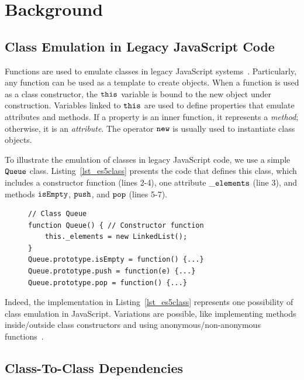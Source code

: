 \documentclass[review]{elsarticle}
\newcommand{\mcode}[1]{$\tt #1$}
\begin{document}
\section{Background}
\label{sec:background}

\subsection{Class Emulation in Legacy JavaScript Code}
\label{sec:class-emulation}

Functions are used to emulate classes in legacy JavaScript systems~\cite{leonardo-jsep2017, rostami2016}. Particularly, any function can be used as a template to create objects. When a function is used as a class constructor, the \mcode{this} variable is bound to the new object under construction. Variables linked to \mcode{this} are used to define properties that emulate attributes and methods. If a property is an inner function, it represents a {\em method}; otherwise, it is an {\em attribute}. The operator \mcode{new} is usually used to instantiate class objects. 

To illustrate the emulation of classes in legacy JavaScript code, we use a simple \mcode{Queue} class. Listing~\ref{lst_es5class} presents the code that defines this class, which includes a constructor function (lines 2-4), one attribute \mcode{\_elements} (line 3), and methods \mcode{isEmpty}, \mcode{push}, and \mcode{pop} (lines 5-7). 

\begin{figure}[htbp]
	\begin{lstlisting}[caption=Class emulation in legacy JavaScript code, label=lst_es5class]
// Class Queue
function Queue() { // Constructor function
	this._elements = new LinkedList();
}
Queue.prototype.isEmpty = function() {...}
Queue.prototype.push = function(e) {...}
Queue.prototype.pop = function() {...}
	\end{lstlisting}
\end{figure}

Indeed, the implementation in Listing~\ref{lst_es5class} represents one possibility of class emulation in JavaScript. Variations are possible, like implementing methods inside/outside class constructors and using anonymous/non-anonymous functions~\cite{silva-saner2015, gama:2012}.


\subsection{Class-To-Class Dependencies}
\label{subsec:dependencies}
\end{document}
